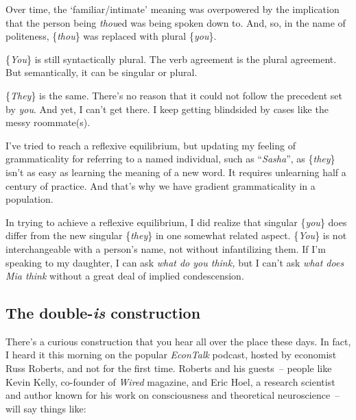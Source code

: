 Over time, the `familiar/intimate' meaning was overpowered by the implication that the person being \textit{thou}ed was being spoken down to. And, so, in the name of politeness, \{\textit{thou}\} was replaced with plural \{\textit{you}\}.

\{\textit{You}\} is still syntactically plural. The verb agreement is the plural agreement. But semantically, it can be singular or plural.

\{\textit{They}\} is the same. There's no reason that it could not follow the precedent set by \textit{you}. And yet, I can't get there. I keep getting blindsided by cases like the messy roommate(s).

I've tried to reach a reflexive equilibrium, but updating my feeling of grammaticality for referring to a named individual, such as ``\textit{Sasha}'', as \{\textit{they}\} isn't as easy as learning the meaning of a new word. It requires unlearning half a century of practice. And that's why we have gradient grammaticality in a population.

In trying to achieve a reflexive equilibrium, I did realize that singular \{\textit{you}\} does differ from the new singular \{\textit{they}\} in one somewhat related aspect. \{\textit{You}\} is not interchangeable with a person's name, not without infantilizing them. If I'm speaking to my daughter, I can ask \textit{what do you think,} but I can't ask \textit{what does Mia think} without a great deal of implied condescension.
\newpage
\subsection{The double-\textit{is} construction}

There's a curious construction that you hear all over the place these days. In fact, I heard it this morning on the popular \textit{EconTalk} podcast, hosted by economist Russ Roberts, and not for the first time. Roberts and his guests~-- people like Kevin Kelly, co-founder of \textit{Wired} magazine, and Eric Hoel, a research scientist and author known for his work on consciousness and theoretical neuroscience~-- will say things like:

\ea
 \z
\z

